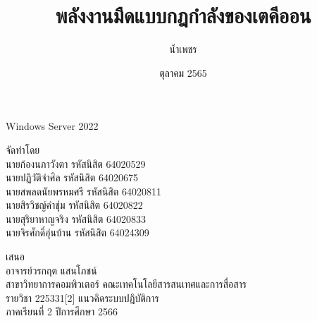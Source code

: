 \documentclass[a4paper,12pt]{upthesis}
\title{  						%
พลังงานมืดแบบกฎกำลังของเตคีออน
}
\author{น้ำเพชร}{แก้ววิลัย}
\date{ตุลาคม 2565}                                               %
\begin{document}

\thispagestyle{empty}
\begin{center}
  \Large{Windows Server 2022\\}
  \vspace{3cm}
  \centering
  \begin{center}
  จัดทำโดย\\
  \vspace{1cm}
  นายก้องนภา\hspace{0.6cm}วังตา \hspace{1cm} รหัสนิสิต \hspace{0.2cm} 64020529\\
  นายปฏิวัติ\hspace{1.1cm}จำศิล \hspace{0.9cm} รหัสนิสิต \hspace{0.2cm} 64020675\\
  นายสพลดนัย\hspace{0.5cm}พรหมศรี \hspace{0.25cm} รหัสนิสิต \hspace{0.2cm} 64020811\\
  นายสิรวิชญ์\hspace{0.9cm}คำชุ่ม \hspace{0.85cm} รหัสนิสิต \hspace{0.2cm} 64020822\\
  นายสุริยา\hspace{1.3cm}หาญจริง \hspace{0.3cm} รหัสนิสิต \hspace{0.2cm} 64020833\\
  นายจิรศักดิ์\hspace{1cm}อุ่นบ้าน \hspace{0.45cm} รหัสนิสิต \hspace{0.2cm} 64024309\\
  \end{center}
  \vspace{3cm}
  เสนอ\\
  อาจารย์วรกฤต แสนโภชน์\\

  \vspace{4cm}
  สาขาวิทยาการคอมพิวเตอร์   คณะเทคโนโลยีสารสนเทศและการสื่อสาร\\
  รายวิชา 225331[2] แนวคิดระบบปฎิบัติการ\\
  ภาคเรียนที่ 2 ปีการศึกษา 2566\\
  \end{center}
  
  

\pagestyle{headings}
\setcounter{page}{1}

\newpage




\end{document}
